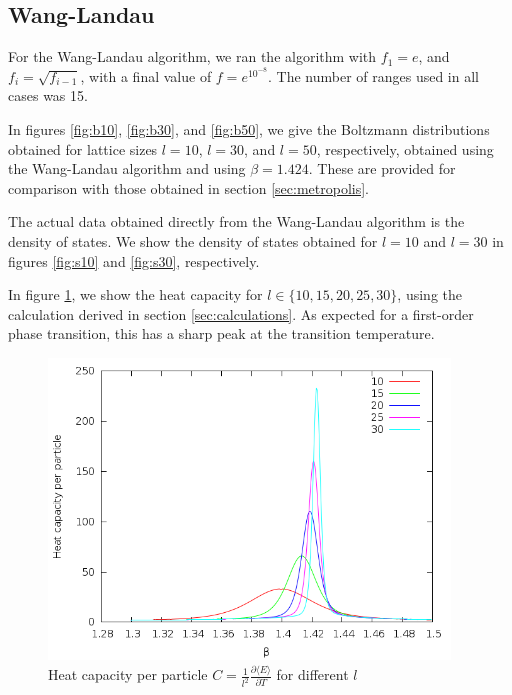 \documentclass{article}
\begin{document}
\subsection{Wang-Landau}
For the Wang-Landau algorithm, we ran the algorithm with $f_1 = e$, and $f_i = \sqrt{f_{i-1}}$, with a final value of $f = e^{10^{-8}}$.
The number of ranges used in all cases was 15.

In figures \ref{fig:b10}, \ref{fig:b30}, and \ref{fig:b50}, we give the Boltzmann distributions obtained for lattice sizes $l = 10$, $l = 30$, and $l = 50$, respectively, obtained using the Wang-Landau algorithm and using $\beta = 1.424$.
These are provided for comparison with those obtained in section \ref{sec:metropolis}.

The actual data obtained directly from the Wang-Landau algorithm is the density of states.
We show the density of states obtained for $l = 10$ and $l = 30$ in figures \ref{fig:s10} and \ref{fig:s30}, respectively.

In figure \ref{fig:capacity}, we show the heat capacity for $l \in\{10,15,20,25,30\}$, using the calculation derived in section \ref{sec:calculations}.
As expected for a first-order phase transition, this has a sharp peak at the transition temperature.

\begin{figure}[h]
\includegraphics[height=8cm]{../results/wanglandau/capacity.png}
\caption{Heat capacity per particle $C = \frac{1}{l^2}\frac{\partial\langle E\rangle}{\partial T}$ for different $l$}
\label{fig:capacity}
\end{figure}
\end{document}
